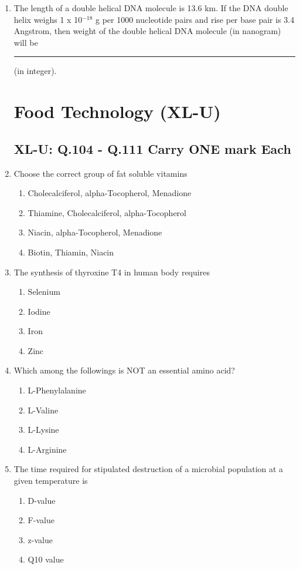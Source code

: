 \documentclass[journal,12pt,onecolumn]{IEEEtran}
\begin{document}
\begin{enumerate}
    \item The length of a double helical DNA molecule is 13.6 km. If the DNA double helix weighs 1 x 10$^{-18}$ g per 1000 nucleotide pairs and rise per base pair is 3.4 Angstrom, then weight of the double helical DNA molecule (in nanogram) will be \rule{1 cm}{0.15 mm} (in integer).

\section*{Food Technology (XL-U)}
\subsection*{XL-U: Q.104 - Q.111 Carry ONE mark Each}

    \item Choose the correct group of fat soluble vitamins
    \begin{enumerate}
        \item Cholecalciferol, alpha-Tocopherol, Menadione
        \item Thiamine, Cholecalciferol, alpha-Tocopherol
        \item Niacin, alpha-Tocopherol, Menadione
        \item Biotin, Thiamin, Niacin
    \end{enumerate}

    \item The synthesis of thyroxine T4 in human body requires
    \begin{enumerate}
        \item Selenium
        \item Iodine
        \item Iron
        \item Zinc
    \end{enumerate}

    \item Which among the followings is NOT an essential amino acid?
    \begin{enumerate}
        \item L-Phenylalanine
        \item L-Valine
        \item L-Lysine
        \item L-Arginine
    \end{enumerate}

    \item The time required for stipulated destruction of a microbial population at a given temperature is
    \begin{enumerate}
        \item D-value
        \item F-value
        \item z-value
        \item Q10 value
    \end{enumerate}


\end{enumerate}
\end{document}
